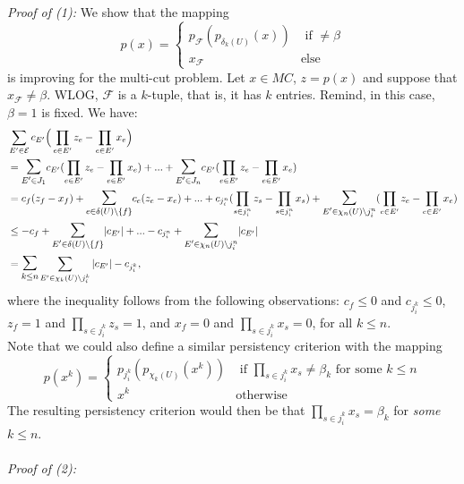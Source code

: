\textit{Proof of (1):}
We show that the mapping \[ p(x)= \begin{cases}
    p_{\mathcal{F}}(p_{\delta_k(U)}(x)) & \text{ if } \neq \beta \\
     x_{\mathcal{F}} & \text{else} 
\end{cases} \]
is improving for the multi-cut problem. Let $x \in MC$, $z=p(x)$ and suppose that $x_{\mathcal{F}} \neq \beta$. WLOG, $\mathcal{F}$ is a $k$-tuple, that is, it has $k$ entries. Remind, in this case, $\beta=1$ is fixed. We have:
\begin{align*}
    & \sum_{E' \in \mathcal{E}} c_{E'} \Big( \prod_{e \in E'} z_e - \prod_{e \in E'} x_e \Big) \\ 
    & = \mathlarger{\mathlarger{\sum}}_{E' \in J_1} c_{E'} (\prod_{e \in E'} z_e - \prod_{e \in E'} x_e ) + ...  +    \mathlarger{\mathlarger{\sum}}_{E' \in J_n} c_{E'} (\prod_{e \in E'} z_e - \prod_{e \in E'} x_e ) \\
    & =     c_{f}(z_f-x_f) + \mathlarger{\mathlarger{\sum}}_{e \in \delta(U) \setminus \{f \} } c_{e} (z_{e}-x_{e}) + ... +c_{j^n_i}(\prod_{s \in j^n_i} z_s - \prod_{s \in j^n_i} x_s) + \mathlarger{\mathlarger{\sum}}_{E' \in \chi_n(U) \setminus j^n_i } (\prod_{e \in E'} z_e - \prod_{e \in E'} x_e ) \\ 
    & \leq - c_{f} + \mathlarger{\mathlarger{\sum}}_{E' \in \delta(U) \setminus \{f \} } |c_{E'}| + ... - c_{j^n_i} +  \mathlarger{\mathlarger{\sum}}_{E' \in  \chi_n(U) \setminus j^n_i } |c_{E'}|\\
    & = \mathlarger{\mathlarger{\sum}}_{k \leq n} \sum_{E' \in \chi_k(U) \setminus j^k_i} |c_{E'}|  - c_{j^k_i},   
\end{align*}
where the inequality follows from the following observations: $c_f \leq 0$ and $c_{j^k_i} \leq 0$, $z_f=1$ and $\prod_{s \in j^k_i} z_s=1$, and $x_f=0$ and $\prod_{s \in j^k_i} x_s=0$, for all $k \leq n$.
\\ Note that we could also define a similar persistency criterion with the mapping 
\[ p(x^k)= \begin{cases}
    p_{j^k_i}(p_{\chi_k(U)}(x^k)) & \text{ if } \prod_{s \in j^k_i} x_s \neq \beta_k \text{ for some } k \leq n \\
    x^k & \text{otherwise} 
\end{cases} \]
The resulting persistency criterion would then be that $\prod_{s \in j^k_i} x_s = \beta_k$ for \textit{some} $k \leq n$. \\ \\ 
\textit{Proof of (2):}
